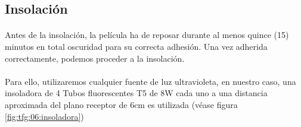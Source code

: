 \pagebreak
\subsection{Insolación}

\paragraph{} Antes de la insolación, la película ha de reposar durante al menos quince (15) minutos en total oscuridad para su correcta adhesión. Una vez adherida correctamente, podemos proceder a la insolación. 

\paragraph{} Para ello, utilizaremos cualquier fuente de luz ultravioleta, en nuestro caso, una insoladora de 4 Tubos fluorescentes T5 de 8W cada uno a una distancia aproximada del plano receptor de 6cm es utilizada (véase figura \ref{fig:tfg:06:insoladora})


